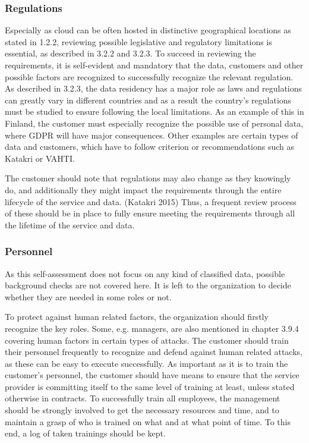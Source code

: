 \documentclass{article}
\begin{document}
\subsubsection{Regulations}
Especially as cloud can be often hosted in distinctive geographical locations as stated in 1.2.2, reviewing possible legislative and regulatory limitations is essential, as described in 3.2.2 and 3.2.3. To succeed in reviewing the requirements, it is self-evident and mandatory that the data, customers and other possible factors are recognized to successfully recognize the relevant regulation. As described in 3.2.3, the data residency has a major role as laws and regulations can greatly vary in different countries and as a result the country's regulations must be studied to ensure following the local limitations. As an example of this in Finland, the customer must especially recognize the possible use of personal data, where GDPR will have major consequences. Other examples are certain types of data and customers, which have to follow criterion or recommendations such as Katakri or VAHTI.
\par
The customer should note that regulations may also change as they knowingly do, and additionally they might impact the requirements through the entire lifecycle of the service and data. (Katakri 2015) Thus, a frequent review process of these should be in place to fully ensure meeting the requirements through all the lifetime of the service and data.

\subsubsection{Personnel}
As this self-assessment does not focus on any kind of classified data, possible background checks are not covered here. It is left to the organization to decide whether they are needed in some roles or not.
\par
To protect against human related factors, the organization should firstly recognize the key roles. Some, e.g. managers, are also mentioned in chapter 3.9.4 covering human factors in certain types of attacks. The customer should train their personnel frequently to recognize and defend against human related attacks, as these can be easy to execute successfully. As important as it is to train the customer's personnel, the customer should have means to ensure that the service provider is committing itself to the same level of training at least, unless stated otherwise in contracts. To successfully train all employees, the management should be strongly involved to get the necessary resources and time, and to maintain a grasp of who is trained on what and at what point of time. To this end, a log of taken trainings should be kept.
\end{document}

